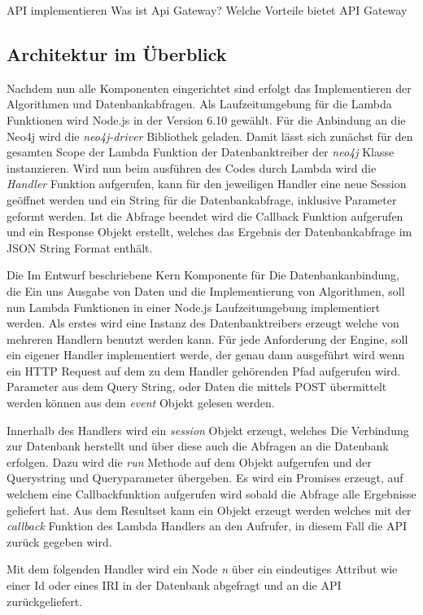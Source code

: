 API implementieren
Was ist Api Gateway?
Welche Vorteile bietet API Gateway


\subsection{Architektur im Überblick}



Nachdem nun alle Komponenten eingerichtet sind erfolgt das Implementieren der Algorithmen und Datenbankabfragen. Als Laufzeitumgebung für die Lambda Funktionen wird Node.js in der Version 6.10 gewählt. Für die Anbindung an die Neo4j wird die \textit{neo4j-driver} Bibliothek geladen. Damit lässt sich zunächst für den gesamten Scope der Lambda Funktion der Datenbanktreiber der \textit{neo4j} Klasse instanzieren. 
Wird nun beim ausführen des Codes durch Lambda wird die \textit{Handler} Funktion aufgerufen, kann für den jeweiligen Handler eine neue Session geöffnet werden und ein String für die Datenbankabfrage, inklusive Parameter geformt werden. Ist die Abfrage beendet wird die Callback Funktion aufgerufen und ein Response Objekt erstellt, welches das Ergebnis der Datenbankabfrage im JSON String Format enthält.

Die Im Entwurf beschriebene Kern Komponente für Die Datenbankanbindung, die Ein uns Ausgabe von Daten und die Implementierung von Algorithmen, soll nun Lambda Funktionen in einer Node.js Laufzeitumgebung implementiert werden. Als erstes wird eine Instanz des Datenbanktreibers erzeugt welche von mehreren Handlern benutzt werden kann. Für jede Anforderung der Engine, soll ein eigener Handler implementiert werde, der genau dann ausgeführt wird wenn ein HTTP Request auf dem zu dem Handler gehörenden Pfad aufgerufen wird. Parameter aus dem Query String, oder Daten die mittels POST übermittelt werden können aus dem \textit{event} Objekt gelesen werden. 

Innerhalb des Handlers wird ein \textit{session} Objekt erzeugt, welches Die Verbindung zur Datenbank herstellt und über diese auch die Abfragen an die Datenbank erfolgen. Dazu wird die \textit{run} Methode auf dem Objekt aufgerufen und der Querystring und Queryparameter übergeben. Es wird ein Promises erzeugt, auf welchem eine Callbackfunktion aufgerufen wird sobald die Abfrage alle Ergebnisse geliefert hat. Aus dem Resultset kann ein Objekt erzeugt werden welches mit der \textit{callback} Funktion des Lambda Handlers an den Aufrufer, in diesem Fall die API zurück gegeben wird.

Mit dem folgenden Handler wird ein Node \textit{n} über ein eindeutiges Attribut wie einer Id oder eines IRI in der Datenbank abgefragt und an die API zurückgeliefert.


